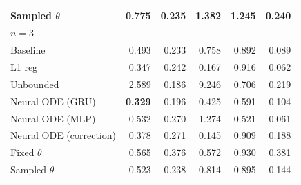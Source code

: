 \begin{tabular}{lrrrrr}
Sampled $\theta$ & 0.775 & 0.235 & 1.382 & 1.245 & 0.240 \\
\midrule
\multicolumn{6}{l}{\textbf{$n=3$}} \\
Baseline & 0.493 & 0.233 & 0.758 & 0.892 & 0.089 \\
L1 reg & 0.347 & 0.242 & 0.167 & 0.916 & 0.062 \\
Unbounded & 2.589 & 0.186 & 9.246 & 0.706 & 0.219 \\
Neural ODE (GRU) & \textbf{0.329} & 0.196 & 0.425 & 0.591 & 0.104 \\
Neural ODE (MLP) & 0.532 & 0.270 & 1.274 & 0.521 & 0.061 \\
Neural ODE (correction) & 0.378 & 0.271 & 0.145 & 0.909 & 0.188 \\
Fixed $\theta$ & 0.565 & 0.376 & 0.572 & 0.930 & 0.381 \\
Sampled $\theta$ & 0.523 & 0.238 & 0.814 & 0.895 & 0.144 \\
\bottomrule
\end{tabular}
